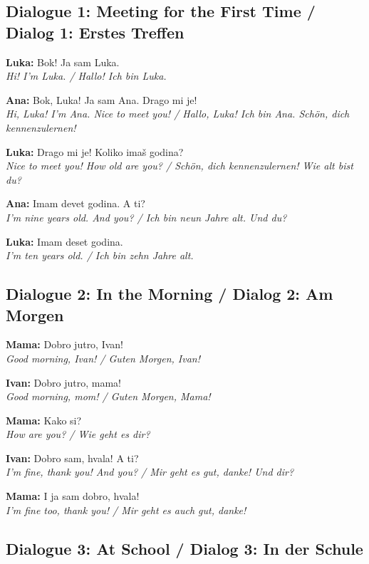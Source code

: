 \begin{culture}
\subsection*{Dialogue 1: Meeting for the First Time / Dialog 1: Erstes Treffen}

\textbf{Luka:} Bok! Ja sam Luka. \\
\textit{Hi! I'm Luka. / Hallo! Ich bin Luka.}

\textbf{Ana:} Bok, Luka! Ja sam Ana. Drago mi je! \\
\textit{Hi, Luka! I'm Ana. Nice to meet you! / Hallo, Luka! Ich bin Ana. Schön, dich kennenzulernen!}

\textbf{Luka:} Drago mi je! Koliko imaš godina? \\
\textit{Nice to meet you! How old are you? / Schön, dich kennenzulernen! Wie alt bist du?}

\textbf{Ana:} Imam devet godina. A ti? \\
\textit{I'm nine years old. And you? / Ich bin neun Jahre alt. Und du?}

\textbf{Luka:} Imam deset godina. \\
\textit{I'm ten years old. / Ich bin zehn Jahre alt.}

\subsection*{Dialogue 2: In the Morning / Dialog 2: Am Morgen}

\textbf{Mama:} Dobro jutro, Ivan! \\
\textit{Good morning, Ivan! / Guten Morgen, Ivan!}

\textbf{Ivan:} Dobro jutro, mama! \\
\textit{Good morning, mom! / Guten Morgen, Mama!}

\textbf{Mama:} Kako si? \\
\textit{How are you? / Wie geht es dir?}

\textbf{Ivan:} Dobro sam, hvala! A ti? \\
\textit{I'm fine, thank you! And you? / Mir geht es gut, danke! Und dir?}

\textbf{Mama:} I ja sam dobro, hvala! \\
\textit{I'm fine too, thank you! / Mir geht es auch gut, danke!}

\subsection*{Dialogue 3: At School / Dialog 3: In der Schule}


\end{culture}
